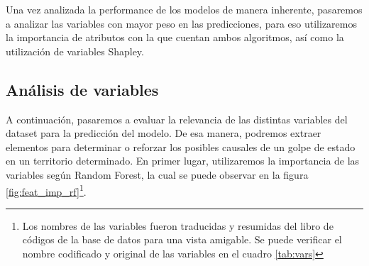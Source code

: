 \documentclass{article}
\begin{document}
Una vez analizada la performance de los modelos de manera inherente, pasaremos a analizar
las variables con mayor peso en las predicciones, para eso utilizaremos la importancia de
atributos con la que cuentan ambos algoritmos, así como la utilización de variables Shapley.





\subsection{Análisis de variables}
A continuación, pasaremos a evaluar la relevancia de las distintas variables del dataset
para la predicción del modelo. De esa manera, podremos extraer elementos para determinar
o reforzar los posibles causales de un golpe de estado en un territorio determinado. En 
primer lugar, utilizaremos la importancia de las variables según Random Forest, la cual
se puede observar en la figura \ref{fig:feat_imp_rf}\footnote{Los nombres de las variables fueron
traducidas y resumidas del libro de códigos de la base de datos para una vista amigable.
Se puede verificar el nombre codificado y original de las variables en el cuadro \ref{tab:vars}}.
\end{document}
